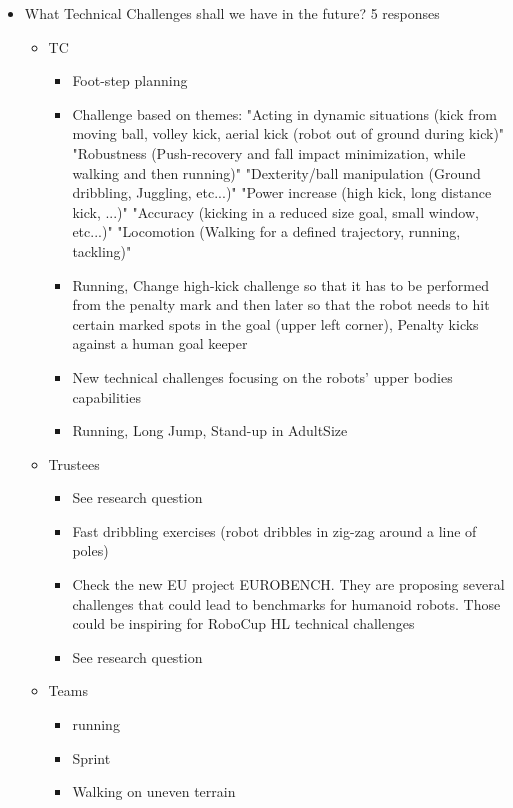 \documentclass{article}
\begin{document}
\begin{itemize} 
   \item What Technical Challenges shall we have in the future? 5 responses
   \begin{itemize} 
       \item TC
       \begin{itemize} 
           \item Foot-step planning
           \item Challenge based on themes: "Acting in dynamic situations (kick from moving ball, volley kick, aerial kick (robot out of ground during kick)" "Robustness (Push-recovery and fall impact minimization, while walking and then running)" "Dexterity/ball manipulation (Ground dribbling, Juggling, etc...)" "Power increase (high kick, long distance kick, ...)" "Accuracy (kicking in a reduced size goal, small window,  etc...)" "Locomotion (Walking for a defined trajectory, running, tackling)"
           \item Running, Change high-kick challenge so that it has to be performed from the penalty mark and then later so that the robot needs to hit certain marked spots in the goal (upper left corner),  Penalty kicks against a human goal keeper
           \item New technical challenges focusing on the robots' upper bodies capabilities 
           \item Running, Long Jump, Stand-up in AdultSize
   \end{itemize}
       \item Trustees
       \begin{itemize} 
           \item See research question
           \item Fast dribbling exercises (robot dribbles in zig-zag around a line of poles)
           \item Check the new EU project EUROBENCH. They are proposing several challenges that could lead to benchmarks for humanoid robots. Those could be inspiring for RoboCup HL technical challenges
           \item See research question
   \end{itemize}
       \item Teams
       \begin{itemize} 
           \item running
           \item Sprint
           \item Walking on uneven terrain

\end{itemize}
\end{itemize}
\end{itemize}
\end{document}
